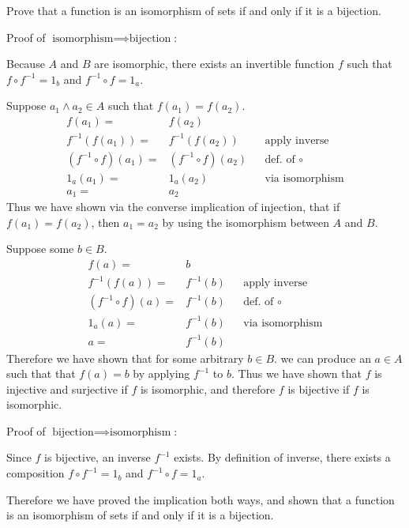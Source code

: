 \begin{ttta}
	Prove that a function is an isomorphism of sets if and only if it is a bijection.
\end{ttta}
\begin{proofitem}
	\item Proof of $\text{isomorphism}\implies \text{bijection}$:
	\begin{proofitem}
		\item Because $A$ and $B$ are isomorphic, there exists an invertible function
		$f$ such that $f\circ f^{-1}=1_b$ and $f^{-1}\circ f = 1_a$.
		\item Suppose $a_1 \land a_2 \in A$ such that $f(a_1)=f(a_2)$.
		\begin{align*}
			f(a_1) =               & f(a_2)                                           \\
			f^{-1}(f(a_1)) =       & f^{-1}(f(a_2))       &  & \text{apply inverse}   \\
			(f^{-1}\circ f)(a_1) = & (f^{-1}\circ f)(a_2) &  & \text{def. of }\circ   \\
			1_a(a_1) =             & 1_a(a_2)             &  & \text{via isomorphism} \\
			a_1 =                  & a_2
		\end{align*}
		Thus we have shown via the converse implication of injection, that if $f(a_1)=f(a_2)$, then $a_1=a_2$ by
		using the isomorphism between $A$ and $B$.
		\item Suppose some $b\in B$.
		\begin{align*}
			f(a) =               & b                                     \\
			f^{-1}(f(a)) =       & f^{-1}(b) &  & \text{apply inverse}   \\
			(f^{-1}\circ f)(a) = & f^{-1}(b) &  & \text{def. of }\circ   \\
			1_a(a) =             & f^{-1}(b) &  & \text{via isomorphism} \\
			a =                  & f^{-1}(b)
		\end{align*}
		Therefore we have shown that for some arbitrary $b\in B$. we can produce an
		$a\in A$ such that that $f(a)=b$ by applying $f^{-1}$ to $b$. Thus we have shown
		that $f$ is injective and surjective if $f$ is isomorphic, and therefore $f$ is
		bijective if $f$ is isomorphic.
	\end{proofitem}
	\item Proof of $\text{bijection}\implies \text{isomorphism}$:
	\begin{proofitem}
		\item Since $f$ is bijective, an inverse $f^{-1}$ exists. By definition of
		inverse, there exists a composition $f\circ f^{-1}=1_b$ and $f^{-1}\circ
			f=1_a$.
	\end{proofitem}
	Therefore we have proved the implication both ways, and shown that a function is
	an isomorphism of sets if and only if it is a bijection.
\end{proofitem}

